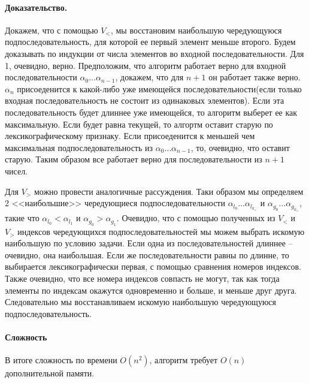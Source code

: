 \documentclass[12pt]{article}
\begin{document}
\paragraph{Доказательство.}
Докажем, что с помощью $ V_< $, мы восстановим наибольшую чередующуюся подпоследовательность, 
для которой ее первый элемент меньше второго.
Будем доказывать по индукции от числа элементов во входной последовательности. Для 1, очевидно, верно.
Предположим, что алгоритм работает верно для входной последовательности $ \alpha_0 \dots \alpha_{n - 1} $,
докажем, что для $ n + 1 $ он работает также верно.
$\alpha_n$ присоеденится к какой-либо уже имеющейся последовательности(если только входная последовательность
не состоит из одинаковых элементов). Если эта последовательность будет длиннее уже имеющейся, то алгоритм
выберет ее как максимальную. Если будет равна текущей, то алгортм оставит старую по лексикографическому
признаку. Если присоеденится к меньшей чем максимальная подпоследовательность из $ \alpha_0 \dots \alpha_{n - 1} $,
то, очевидно, что оставит старую. Таким образом все работает верно для последовательности из $ n + 1 $ чисел.

Для $ V_> $ можно провести аналогичные рассуждения. Таки образом мы определяем 2 <<наибольшие>>
чередующиеся подпоследовательности $ \alpha_{l_0}\dots\alpha_{l_{k_<}} $ и $ \alpha_{g_0}\dots\alpha_{g_{k_>}} $, такие что $ \alpha_{l_0} < \alpha_{l_1} $
и $ \alpha_{g_0} > \alpha_{g_1} $.
Очевидно, что с помощью полученных из $ V_< $ и $ V_> $ индексов чередующихся подпоследовательностей мы можем
выбрать искомую наибольшую по условию задачи. Если одна из последовательностей длиннее -- очевидно, она наибольшая.
Если же последовательности равны по длинне, то выбирается лексикографически первая, с помощью сравнения номеров 
индексов. Также очевидно, что все номера индексов совпасть не могут, так как тогда элементы по индексам окажутся
одновременно и больше, и меньше друг друга. Следовательно мы восстанавливаем искомую наибольшую чередующуюся
подпоследовательность.



\paragraph{Сложность}
В итоге сложность по времени $ O(n^2) $, алгоритм требует $ O(n) $ дополнительной памяти.
\end{document}

